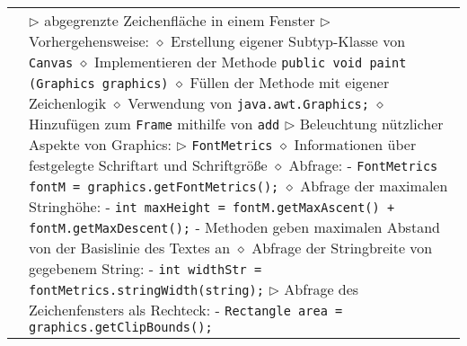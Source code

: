 \begin{longtable}{ | p{} p{} | }
	\makecell[l]{Klasse Canvas} & \makecell[l]{
	$\rhd$ abgegrenzte Zeichenfläche in einem Fenster \\
	$\rhd$ Vorhergehensweise: \\
	\hspace{0.4cm} $\diamond$ Erstellung eigener Subtyp-Klasse von \texttt{Canvas} \\
	\hspace{0.4cm} $\diamond$ Implementieren der Methode \texttt{public void paint (Graphics graphics)} \\
	\hspace{0.4cm} $\diamond$ Füllen der Methode mit eigener Zeichenlogik \\
	\hspace{0.4cm} $\diamond$ Verwendung von \texttt{java.awt.Graphics;} \\
	\hspace{0.4cm} $\diamond$ Hinzufügen zum \texttt{Frame} mithilfe von \texttt{add} \\
	$\rhd$ Beleuchtung nützlicher Aspekte von Graphics: \\
	$\rhd$ \texttt{FontMetrics} \\
	\hspace{0.4cm} $\diamond$ Informationen über festgelegte Schriftart und Schriftgröße \\
	\hspace{0.4cm} $\diamond$ Abfrage: \\
	\hspace{0.6cm} - \texttt{FontMetrics fontM = graphics.getFontMetrics();} \\
	\hspace{0.4cm} $\diamond$ Abfrage der maximalen Stringhöhe: \\
	\hspace{0.6cm} - \texttt{int maxHeight = fontM.getMaxAscent() + fontM.getMaxDescent();} \\
	\hspace{0.6cm} - Methoden geben maximalen Abstand von der Basislinie des Textes an \\
	\hspace{0.4cm} $\diamond$ Abfrage der Stringbreite von gegebenem String: \\
	\hspace{0.6cm} - \texttt{int widthStr = fontMetrics.stringWidth(string);} \\
	$\rhd$ Abfrage des Zeichenfensters als Rechteck: \\
	\hspace{0.6cm} - \texttt{Rectangle area = graphics.getClipBounds();} \\
}
\end{longtable}
